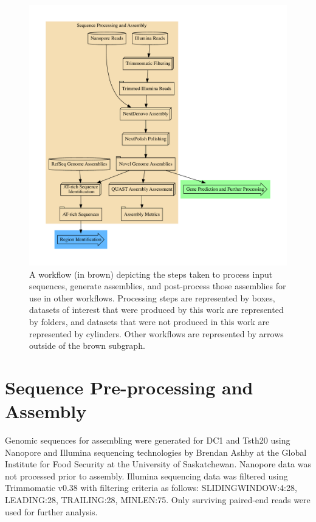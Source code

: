 \begin{figure}
  \centering
  \includegraphics[width=\textwidth]{figures/assembly-met.pdf}
  \caption{A workflow (in brown) depicting the steps taken to process
    input sequences, generate assemblies, and post-process those
    assemblies for use in other workflows. Processing steps are
    represented by boxes, datasets of interest that were produced by
    this work are represented by folders, and datasets that were not
    produced in this work are represented by cylinders. Other
    workflows are represented by arrows outside of the brown
    subgraph.}
  \label{fig:seq-workflow}
\end{figure}

\section{Sequence Pre-processing and Assembly}
\label{met:seq-process}

Genomic sequences for assembling were generated for DC1 and Tsth20
using Nanopore\cite{Wang2021} and Illumina\cite{Bennett2004}
sequencing technologies by Brendan Ashby at the Global Institute for
Food Security at the University of Saskatchewan. Nanopore data was not
processed prior to assembly. Illumina sequencing data was filtered
using Trimmomatic v0.38\cite{Bolger2014} with filtering criteria as
follows: SLIDINGWINDOW:4:28, LEADING:28, TRAILING:28, MINLEN:75. Only
surviving paired-end reads were used for further analysis.

